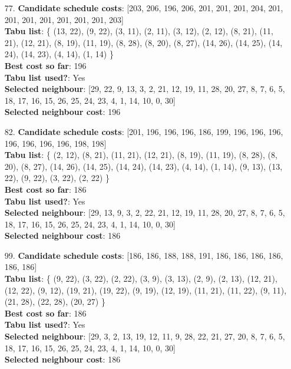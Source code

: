 \documentclass[fleqn]{article}
\begin{document}
\begin{itemize}
    \item[77.] \textbf{Candidate schedule costs}: [203, 206, 196, 206, 201, 201, 201, 204, 201, 201, 201, 201, 201, 201, 201, 203] \\
    \textbf{Tabu list}: \{ (13, 22), (9, 22), (3, 11), (2, 11), (3, 12), (2, 12), (8, 21), (11, 21), (12, 21), (8, 19), (11, 19), (8, 28), (8, 20), (8, 27), (14, 26), (14, 25), (14, 24), (14, 23), (4, 14), (1, 14) \} \\
    \textbf{Best cost so far}: 196 \\
    \textbf{Tabu list used?}: Yes \\
    \textbf{Selected neighbour}: [29, 22, 9, 13, 3, 2, 21, 12, 19, 11, 28, 20, 27, 8, 7, 6, 5, 18, 17, 16, 15, 26, 25, 24, 23, 4, 1, 14, 10, 0, 30] \\
    \textbf{Selected neighbour cost}: 196
      

    \item[82.] \textbf{Candidate schedule costs}: [201, 196, 196, 196, 186, 199, 196, 196, 196, 196, 196, 196, 196, 198, 198] \\
    \textbf{Tabu list}: \{ (2, 12), (8, 21), (11, 21), (12, 21), (8, 19), (11, 19), (8, 28), (8, 20), (8, 27), (14, 26), (14, 25), (14, 24), (14, 23), (4, 14), (1, 14), (9, 13), (13, 22), (9, 22), (3, 22), (2, 22) \} \\
    \textbf{Best cost so far}: 186 \\
    \textbf{Tabu list used?}: Yes \\
    \textbf{Selected neighbour}: [29, 13, 9, 3, 2, 22, 21, 12, 19, 11, 28, 20, 27, 8, 7, 6, 5, 18, 17, 16, 15, 26, 25, 24, 23, 4, 1, 14, 10, 0, 30] \\
    \textbf{Selected neighbour cost}: 186

    \item[99.] \textbf{Candidate schedule costs}: [186, 186, 188, 188, 191, 186, 186, 186, 186, 186, 186] \\
    \textbf{Tabu list}: \{ (9, 22), (3, 22), (2, 22), (3, 9), (3, 13), (2, 9), (2, 13), (12, 21), (12, 22), (9, 12), (19, 21), (19, 22), (9, 19), (12, 19), (11, 21), (11, 22), (9, 11), (21, 28), (22, 28), (20, 27) \} \\
    \textbf{Best cost so far}: 186 \\
    \textbf{Tabu list used?}: Yes \\
    \textbf{Selected neighbour}: [29, 3, 2, 13, 19, 12, 11, 9, 28, 22, 21, 27, 20, 8, 7, 6, 5, 18, 17, 16, 15, 26, 25, 24, 23, 4, 1, 14, 10, 0, 30] \\
    \textbf{Selected neighbour cost}: 186
      
  \end{itemize}
\end{document}
